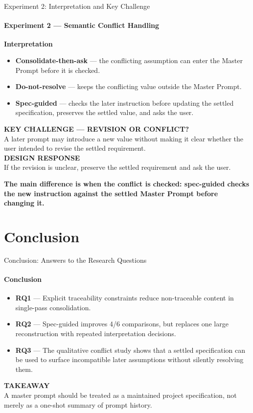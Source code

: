 \documentclass[aspectratio=169,11pt,c]{beamer}
\newcommand{\calllbl}[1]{{\footnotesize\bfseries\color{primaryblue}\MakeUppercase{#1}}\\[2pt]}
\begin{document}
\begin{frame}{Experiment 2: Interpretation and Key Challenge}
  \framesubtitle{Experiment 2 --- Semantic Conflict Handling}
  {\footnotesize\bfseries\color{primaryblue}Interpretation}
  \begin{itemize}\scriptsize
    \item \textbf{Consolidate-then-ask} --- the conflicting assumption can enter the Master Prompt before it is checked.
    \item \textbf{Do-not-resolve} --- keeps the conflicting value outside the Master Prompt.
    \item \textbf{Spec-guided} --- checks the later instruction before updating the settled specification, preserves the settled value, and asks the user.
  \end{itemize}
  \vspace{3pt}
  \begin{calloutbox}
    \footnotesize
    \calllbl{Key challenge --- revision or conflict?} A later prompt may introduce a new value without making it clear whether the user intended to revise the settled requirement.\\[3pt]
    \calllbl{Design response} If the revision is unclear, preserve the settled requirement and ask the user.
  \end{calloutbox}
  \vspace{4pt}
  {\small\bfseries\color{accentorange}\centering The main difference is when the conflict is checked: spec-guided checks the new instruction against the settled Master Prompt before changing it.\par}
\end{frame}

\section{Conclusion}

\begin{frame}{Conclusion: Answers to the Research Questions}
  \framesubtitle{Conclusion}
  \small
  \begin{itemize}
    \item \textbf{RQ1} --- Explicit traceability constraints reduce non-traceable content in single-pass consolidation.
    \item \textbf{RQ2} --- Spec-guided improves 4/6 comparisons, but replaces one large reconstruction with repeated interpretation decisions.
    \item \textbf{RQ3} --- The qualitative conflict study shows that a settled specification can be used to surface incompatible later assumptions without silently resolving them.
  \end{itemize}
  \begin{calloutbox}
    \calllbl{Takeaway}A master prompt should be treated as a maintained project specification, not merely as a one-shot summary of prompt history.
  \end{calloutbox}
\end{frame}
\end{document}
